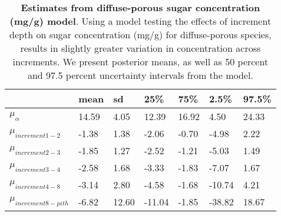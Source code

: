 \documentclass{article}\usepackage[]{graphicx}\usepackage[]{color}
\begin{document}
\begin{table}[ht]
\centering
\caption{\textbf{Estimates from diffuse-porous sugar concentration (mg/g) model}. Using a model testing the effects of increment depth on sugar concentration (mg/g) for diffuse-porous species, results in slightly greater variation in concentration across increments. We present posterior means, as well as 50 percent and 97.5 percent uncertainty intervals from the model.} 
\label{tab:diffsug}
\begingroup\footnotesize
\begin{tabular}{|p{}|p{}|p{}|p{}|p{}|p{}|p{}|}
  \hline
 & mean & sd & 25\% & 75\% & 2.5\% & 97.5\% \\ 
  \hline
$\mu_{\alpha}$ & 14.59 & 4.05 & 12.39 & 16.92 & 4.50 & 24.33 \\ 
  $\mu_{increment 1-2}$ & -1.38 & 1.38 & -2.06 & -0.70 & -4.98 & 2.22 \\ 
  $\mu_{increment 2-3}$ & -1.85 & 1.27 & -2.52 & -1.21 & -5.03 & 1.49 \\ 
  $\mu_{increment 3-4}$ & -2.58 & 1.68 & -3.33 & -1.83 & -7.07 & 1.67 \\ 
  $\mu_{increment 4-8}$ & -3.14 & 2.80 & -4.58 & -1.68 & -10.74 & 4.21 \\ 
  $\mu_{increment 8-pith}$ & -6.82 & 12.60 & -11.04 & -1.85 & -38.82 & 18.67 \\ 
   \hline
\end{tabular}
\endgroup
\end{table}
\end{document}
